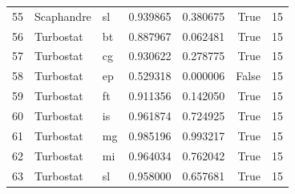 \begin{tabular}{lllrrrr}
55 & Scaphandre & sl & 0.939865 & 0.380675 & True & 15 \\
56 & Turbostat & bt & 0.887967 & 0.062481 & True & 15 \\
57 & Turbostat & cg & 0.930622 & 0.278775 & True & 15 \\
58 & Turbostat & ep & 0.529318 & 0.000006 & False & 15 \\
59 & Turbostat & ft & 0.911356 & 0.142050 & True & 15 \\
60 & Turbostat & is & 0.961874 & 0.724925 & True & 15 \\
61 & Turbostat & mg & 0.985196 & 0.993217 & True & 15 \\
62 & Turbostat & mi & 0.964034 & 0.762042 & True & 15 \\
63 & Turbostat & sl & 0.958000 & 0.657681 & True & 15 \\
\bottomrule
\end{tabular}
